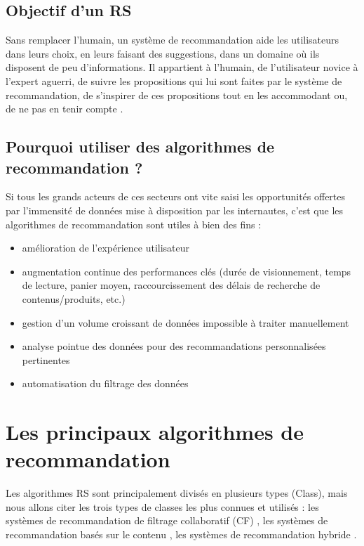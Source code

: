     \subsection{Objectif d’un RS}
    \par Sans remplacer l’humain, un système de recommandation aide les utilisateurs dans leurs choix, en leurs faisant des suggestions, dans un domaine où ils disposent de peu d'informations. Il appartient à l’humain, de l’utilisateur novice à l’expert aguerri, de suivre les propositions qui lui sont faites par le système de recommandation, de s’inspirer de ces propositions tout en les accommodant ou, de ne pas en tenir compte \cite{hotel:hal-02192576}.
    
    \subsection{Pourquoi utiliser des algorithmes de recommandation ?}
    \par Si tous les grands acteurs de ces secteurs ont vite saisi les opportunités offertes par l’immensité de données mise à disposition par les internautes, c’est que les algorithmes de recommandation sont utiles à bien des fins : \cite{ch1ref17}
    \begin{itemize}
    \setlength{\itemsep}{5pt}
        \item amélioration de l’expérience utilisateur
        \item augmentation continue des performances clés (durée de visionnement, temps de lecture, panier moyen, raccourcissement des délais de recherche de contenus/produits, etc.)
        \item gestion d’un volume croissant de données impossible à traiter manuellement
        \item analyse pointue des données pour des recommandations personnalisées pertinentes
        \item automatisation du filtrage des données
    \end{itemize}

\section{Les principaux algorithmes de recommandation} %
\par Les algorithmes RS sont principalement divisés en plusieurs types (Class), mais nous allons citer les trois types de classes les plus connues et utilisés \cite{ch1ref2} : les systèmes de recommandation de filtrage collaboratif (CF) \cite{ch1ref4}, les systèmes de recommandation basés sur le contenu \cite{ch1ref3}, les systèmes de recommandation hybride \cite{ch1ref5}.

